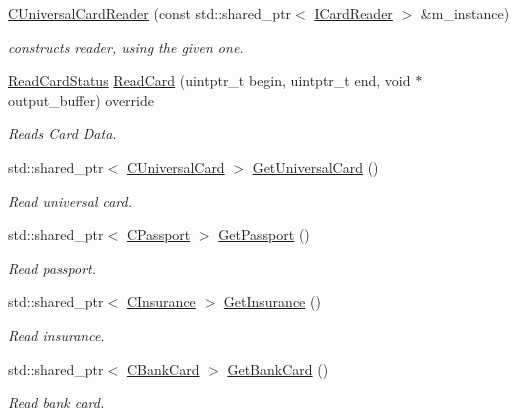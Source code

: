 \begin{DoxyCompactItemize}
\item 
\hyperlink{classCUniversalCardReader_a8938d472093944f454f57185f0ce717b}{C\+Universal\+Card\+Reader} (const std\+::shared\+\_\+ptr$<$ \hyperlink{classICardReader}{I\+Card\+Reader} $>$ \&m\+\_\+instance)
\begin{DoxyCompactList}\small\item\em constructs reader, using the given one. \end{DoxyCompactList}\item 
\hyperlink{classICardReader_a3b289f13ac2a90f46950289aafb551a9}{Read\+Card\+Status} \hyperlink{classCUniversalCardReader_a91e8d783d421cd8130175f1e533a287a}{Read\+Card} (uintptr\+\_\+t begin, uintptr\+\_\+t end, void $\ast$output\+\_\+buffer) override
\begin{DoxyCompactList}\small\item\em Reads Card Data. \end{DoxyCompactList}\item 
std\+::shared\+\_\+ptr$<$ \hyperlink{classCUniversalCard}{C\+Universal\+Card} $>$ \hyperlink{classCUniversalCardReader_a7aa5d11c6b6bb2f8ff57229616e513f0}{Get\+Universal\+Card} ()
\begin{DoxyCompactList}\small\item\em Read universal card. \end{DoxyCompactList}\item 
std\+::shared\+\_\+ptr$<$ \hyperlink{classCPassport}{C\+Passport} $>$ \hyperlink{classCUniversalCardReader_afe8ecb2721d79d3002a3cf1077391379}{Get\+Passport} ()
\begin{DoxyCompactList}\small\item\em Read passport. \end{DoxyCompactList}\item 
std\+::shared\+\_\+ptr$<$ \hyperlink{classCInsurance}{C\+Insurance} $>$ \hyperlink{classCUniversalCardReader_acf9be9b26f2e13b5e8956021c9a4f528}{Get\+Insurance} ()
\begin{DoxyCompactList}\small\item\em Read insurance. \end{DoxyCompactList}\item 
std\+::shared\+\_\+ptr$<$ \hyperlink{classCBankCard}{C\+Bank\+Card} $>$ \hyperlink{classCUniversalCardReader_a9105d8da39ffdf831852c5fffc6e1556}{Get\+Bank\+Card} ()
\begin{DoxyCompactList}\small\item\em Read bank card. \end{DoxyCompactList}\end{DoxyCompactItemize}

